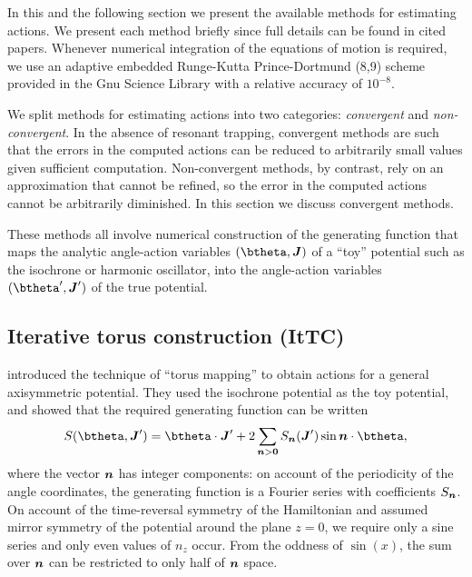 \documentclass[useAMS,usenatbib,fleqn,a4paper]{mn2e}
\newcommand{\bs}[1]{\bmath{#1}}
\begin{document}
In this and the following section we present the available methods for
estimating actions.  We present each method briefly since full details can be
found in cited papers. Whenever numerical integration of the equations of
motion is required, we use an adaptive embedded Runge-Kutta Prince-Dortmund
(8,9) scheme provided in the Gnu Science Library \citep{GSL} with a relative
accuracy of $10^{-8}$.  

We split methods for estimating actions into two categories:
\emph{convergent} and \emph{non-convergent}. In the absence of resonant
trapping, convergent methods are such that the errors in the computed actions
can be reduced to arbitrarily small values given sufficient computation.
Non-convergent methods, by contrast, rely on an approximation that cannot be
refined, so the error in the computed actions cannot be arbitrarily
diminished. In this section we discuss convergent methods.

These methods all involve numerical construction of the generating function that maps
the analytic angle-action variables $(\btheta,\boldsymbol{J})$ of a ``toy''
potential such as the isochrone or harmonic oscillator, into the angle-action
variables $(\btheta',\boldsymbol{J}')$ of the true potential.  

\subsection{Iterative torus construction (ItTC)}\label{Method::ItTorus}

\cite{McGillBinney} introduced the technique of ``torus mapping'' to obtain
actions for a general axisymmetric potential. They used
the isochrone potential as the toy potential, and showed that the required
generating function can be written
\begin{equation}\label{eq:genGF}
S(\btheta,\bs{J}') = \btheta\cdot\bs{J}'
+2 \sum_{\bs{n}>\bs{0}}S_{\bs{n}}(\bs{J}')\sin\bs{n}\cdot\btheta,
\end{equation}
where the vector $\bs{n}$ has integer components: on account of the
periodicity of the angle coordinates, the generating function is a Fourier
series with coefficients $S_{\bs{n}}$. On account of the time-reversal
symmetry of the Hamiltonian and assumed mirror symmetry of the potential
around the plane $z=0$, we require only a sine series and only even values of
$n_z$ occur. From the oddness of $\sin(x)$, the sum over $\bs{n}$ can be
restricted to only half of $\bs{n}$ space. 
\end{document}
